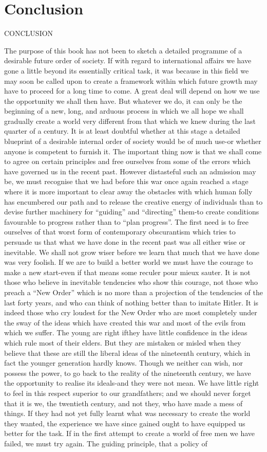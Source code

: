 \documentclass[11pt,openany]{book}
\newcommand{\bookchapterplain}[1]{%
  \clearpage\phantomsection
  \chapter*{#1}%
  \addcontentsline{toc}{chapter}{#1}%
  \markboth{#1}{#1}\thispagestyle{plain}}
\begin{document}
\bookchapterplain{Conclusion}

CONCLUSION

The purpose of this book has not been to sketch a detailed programme of a desirable future order of society. If with regard to international affairs we have gone a little beyond its essentially critical task, it was because in this field we may soon be called upon to create a framework within which future growth may have to proceed for a long time to come. A great deal will depend on how we use the opportunity we shall then have. But whatever we do, it can only be the beginning of a new, long, and arduous process in which we all hope we shall gradually create a world very different from that which we knew during the last quarter of a century. It is at least doubtful whether at this stage a detailed blueprint of a desirable internal order of society would be of much use-or whether anyone is competent to furnish it. The important thing now is that we shall come to agree on certain principles and free ourselves from some of the errors which have governed us in the recent past. However distasteful such an admission may be, we must recognise that we had before this war once again reached a stage where it is more important to clear away the obstacles with which human folly has encumbered our path and to release the creative energy of individuals than to devise further machinery for ``guiding'' and ``directing'' them-to create conditions favourable to progress rather than to ``plan progress''. The first need is to free ourselves of that worst form of contemporary obscurantism which tries to persuade us that what we have done in the recent past was all either wise or inevitable. We shall not grow wiser before we learn that much that we have done was very foolish. If we are to build a better world we must have the courage to make a new start-even if that means some reculer pour mieux sauter. It is not those who believe in inevitable tendencies who show this courage, not those who preach a ``New Order'' which is no more than a projection of the tendencies of the last forty years, and who can think of nothing better than to imitate Hitler. It is indeed those who cry loudest for the New Order who are most completely under the sway of the ideas which have created this war and most of the evils from which we suffer. The young are right ifthey have little confidence in the ideas which rule most of their elders. But they are mistaken or misled when they believe that these are still the liberal ideas of the nineteenth century, which in fact the younger generation hardly knows. Though we neither can wish, nor possess the power, to go back to the reality of the nineteenth century, we have the opportunity to realise its ideals-and they were not mean. We have little right to feel in this respect superior to our grandfathers; and we should never forget that it is we, the twentieth century, and not they, who have made a mess of things. If they had not yet fully learnt what was necessary to create the world they wanted, the experience we have since gained ought to have equipped us better for the task. If in the first attempt to create a world of free men we have failed, we must try again. The guiding principle, that a policy of 
\end{document}

